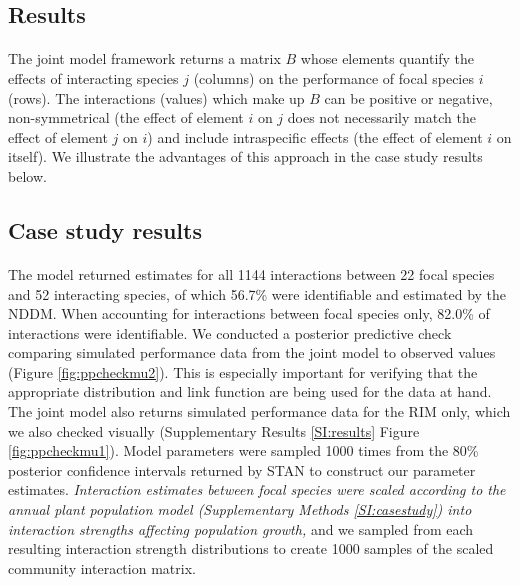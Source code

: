 \documentclass[a4,12pt]{article}
\begin{document}
\begin{refsection}
\section{Results}
    
    \paragraph{}
    The joint model framework returns a matrix $B$ whose elements quantify the effects of interacting species $j$ (columns) on the performance of focal species $i$ (rows). The interactions (values) which make up $B$ can be positive or negative, non-symmetrical (the effect of element $i$ on $j$ does not necessarily match the effect of element $j$ on $i$) and include intraspecific effects (the effect of element $i$ on itself). We illustrate the advantages of this approach in the case study results below. 


    \subsection{Case study results}

    \paragraph{}
    The model returned estimates for all 1144 interactions between 22 focal species and 52 interacting species, of which 56.7\% were identifiable and estimated by the NDDM. When accounting for interactions between focal species only, 82.0\% of interactions were identifiable. We conducted a posterior predictive check comparing simulated performance data from the joint model to observed values (Figure \ref{fig:ppcheckmu2}). This is especially important for verifying that the appropriate distribution and link function are being used for the data at hand. The joint model also returns simulated performance data for the RIM only, which we also checked visually (Supplementary Results \ref{SI:results} Figure \ref{fig:ppcheckmu1}). Model parameters were sampled 1000 times from the 80\% posterior confidence intervals returned by STAN to construct our parameter estimates. \textit{Interaction estimates between focal species were scaled according to the annual plant population model (Supplementary Methods \ref{SI:casestudy}) into interaction strengths affecting population growth,} and we sampled from each resulting interaction strength distributions to create 1000 samples of the scaled community interaction matrix.


\end{refsection}
\end{document}
